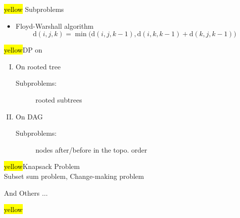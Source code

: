 \begin{frame}{}
  \centerline{\hl{yellow}{\Large {} Subproblems}}

  \vspace{0.50cm}
  \begin{itemize}
    \item Floyd-Warshall algorithm
      \[
	\text{d}(i,j,k) = \min \Big(\text{d}(i,j,k-1), \text{d}(i,k,k-1) + \text{d}(k,j,k-1)\Big)
      \]
  \end{itemize}

\end{frame}

\begin{frame}{}
  \centerline{\hl{yellow}{\Large DP on }}
  \begin{enumerate}[(I)]
    \setlength{\itemsep}{8pt}
    \item On rooted tree
      \begin{description}
	\item[Subproblems:] rooted subtrees
      \end{description}
    \item On DAG
      \begin{description}
	\item[Subproblems:] nodes after/before in the topo. order
      \end{description}
  \end{enumerate}

  \pause
  \vspace{0.60cm}
  \begin{center}
    \hl{yellow}{\Large Knapsack Problem} \\[12pt]

    Subset sum problem, Change-making problem
  \end{center}
\end{frame}

\begin{frame}{}
  \centerline{\huge And Others $\dots$}

  \pause
  \vspace{0.30cm}
\end{frame}

\begin{frame}
  \centerline{\hl{yellow}{}}

  \pause
  \vspace{-0.30cm}
\end{frame}
  
